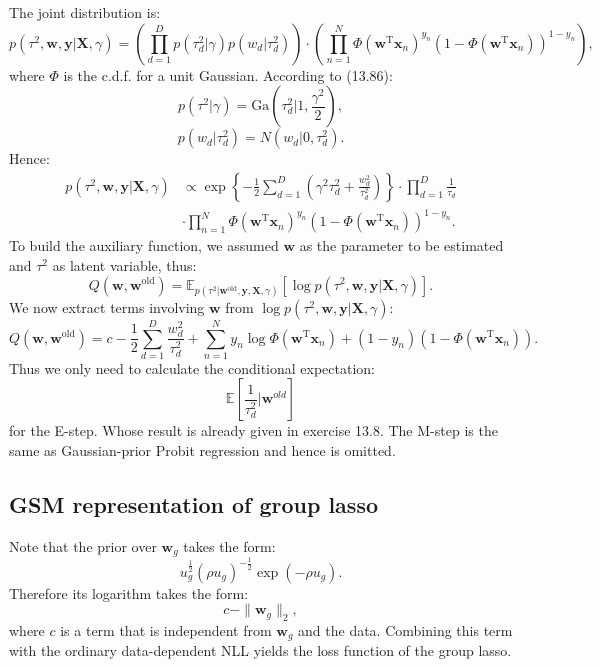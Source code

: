 \documentclass[UTF8]{ctexart}
\begin{document}
The joint distribution is:
$$
p(\tau^{2},\textbf{w},\textbf{y}|\textbf{X},\gamma)=\left(\prod_{d=1}^{D}p(\tau_{d}^{2}|\gamma)p(w_{d}|\tau_{d}^{2})\right)\cdot\left(\prod_{n=1}^{N}\Phi(\textbf{w}^{\text{T}}\textbf{x}_{n})^{y_{n}}(1-\Phi(\textbf{w}^{\text{T}}\textbf{x}_{n}))^{1-y_{n}}\right),
$$
where $\Phi$ is the c.d.f. for a unit Gaussian.
According to (13.86):
$$p(\tau^{2}|\gamma)=\text{Ga}(\tau_{d}^{2}|1,\frac{\gamma^{2}}{2}),$$
$$p(w_{d}|\tau_{d}^{2})=N(w_{d}|0,\tau_{d}^{2}).$$
Hence:
$$
\begin{aligned}
p(\tau^{2},\textbf{w},\textbf{y}|\textbf{X},\gamma)&\propto \exp\left\{ -\frac{1}{2}\sum_{d=1}^{D}\left(\gamma^{2}\tau_{d}^{2} + \frac{w_{d}^{2}}{\tau_{d}^{2}}\right) \right\}\cdot \prod_{d=1}^{D}\frac{1}{\tau_{d}}\\
&\cdot \prod_{n=1}^{N}\Phi(\textbf{w}^{\text{T}}\textbf{x}_{n})^{y_{n}}(1-\Phi(\textbf{w}^{\text{T}}\textbf{x}_{n}))^{1-y_{n}}.
\end{aligned}
$$
To build the auxiliary function, we assumed $\textbf{w}$ as the parameter to be estimated and $\tau^{2}$ as latent variable, thus:
$$Q(\textbf{w},\textbf{w}^{\text{old}})=\mathbb{E}_{p(\tau^{2}|\textbf{w}^{\text{old}},\textbf{y},\textbf{X},\gamma)}[\log p(\tau^{2},\textbf{w},\textbf{y}|\textbf{X},\gamma)].$$
We now extract terms involving $\textbf{w}$ from $\log p(\tau^{2},\textbf{w},\textbf{y}|\textbf{X},\gamma)$:
$$Q(\textbf{w},\textbf{w}^{\text{old}}) = c -\frac{1}{2}\sum_{d=1}^{D} \frac{w_{d}^{2}}{\tau_{d}^{2}} + \sum_{n=1}^{N} y_{n}\log \Phi(\textbf{w}^{\text{T}}\textbf{x}_{n}) + (1-y_{n})(1-\Phi(\textbf{w}^{\text{T}}\textbf{x}_{n})).$$
Thus we only need to calculate the conditional expectation:
$$\mathbb{E}\left[\frac{1}{\tau_{d}^{2}}|\textbf{w}^{old}\right]$$
for the E-step.
Whose result is already given in exercise 13.8.
The M-step is the same as Gaussian-prior Probit regression and hence is omitted.

\subsection{GSM representation  of group lasso}
Note that the prior over $\textbf{w}_{g}$ takes the form:
$$u_{g}^{\frac{1}{2}}(\rho u_{g})^{-\frac{1}{2}}\exp(-\rho u_{g}).$$
Therefore its logarithm takes the form:
$$c-\|\textbf{w}_{g}\|_{2},$$
where $c$ is a term that is independent from $\textbf{w}_{g}$ and the data.
Combining this term with the ordinary data-dependent NLL yields the loss function of the group lasso.
\end{document}
